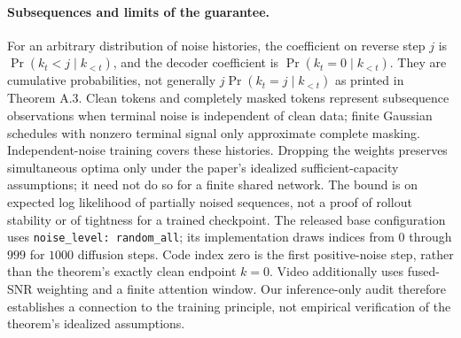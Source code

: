 \paragraph{Subsequences and limits of the guarantee.}
For an arbitrary distribution of noise histories, the coefficient on reverse step $j$ is $\Pr(k_t<j\mid k_{<t})$, and the decoder coefficient is $\Pr(k_t=0\mid k_{<t})$. They are cumulative probabilities, not generally $j\Pr(k_t=j\mid k_{<t})$ as printed in Theorem A.3. Clean tokens and completely masked tokens represent subsequence observations when terminal noise is independent of clean data; finite Gaussian schedules with nonzero terminal signal only approximate complete masking. Independent-noise training covers these histories. Dropping the weights preserves simultaneous optima only under the paper's idealized sufficient-capacity assumptions; it need not do so for a finite shared network. The bound is on expected log likelihood of partially noised sequences, not a proof of rollout stability or of tightness for a trained checkpoint. The released base configuration uses \texttt{noise\_level: random\_all}; its implementation draws indices from $0$ through $999$ for $1000$ diffusion steps. Code index zero is the first positive-noise step, rather than the theorem's exactly clean endpoint $k=0$. Video additionally uses fused-SNR weighting and a finite attention window. Our inference-only audit therefore establishes a connection to the training principle, not empirical verification of the theorem's idealized assumptions.
